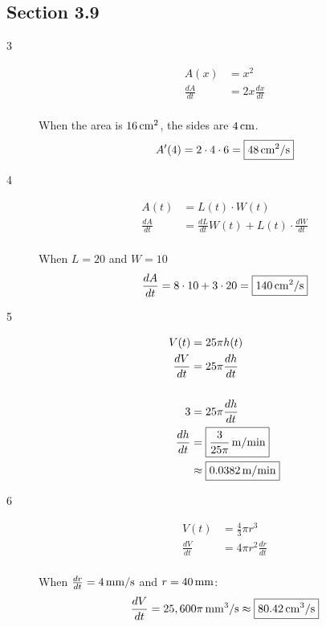 \documentclass[letterpaper, landscape]{exam}
\begin{document}
  \subsection{Section 3.9}
  \begin{description}

    \item[3]
      \begin{align*}
        A(x)          & = x^2 \\
        \frac{dA}{dt} & = 2x \frac{dx}{dt} \\
      \end{align*}

      When the area is $\unit[16]{cm^2}$, the sides are $\unit[4]{cm}$.
      \[
        A'(4) = 2 \cdot 4 \cdot 6 = \boxed{ \unit[48]{cm^2/s} }
      \]

    \item[4]
      \begin{align*}
        A(t)          & = L(t) \cdot W(t) \\
        \frac{dA}{dt} & = \frac{dL}{dt} W(t) + L(t) \cdot \frac{dW}{dt} \\
      \end{align*}

      When $L = 20$ and $W = 10$
      \[
        \frac{dA}{dt} = 8 \cdot 10 + 3 \cdot 20 = \boxed{ \unit[140]{cm^2/s} }
      \]

    \item[5]
      \begin{align*}
        V(t)          & = 25 \pi h(t) \\
        \frac{dV}{dt} & = 25 \pi \frac{dh}{dt} \\
        \\
        3             & = 25 \pi \frac{dh}{dt} \\
        \frac{dh}{dt} & = \boxed{ \unit[\frac{3}{25 \pi}]{m/min} } \\
                      & \approx \boxed{ \unit[0.0382]{m/min} } \\
      \end{align*}

    \item[6]
      \begin{align*}
        V(t)          & = \frac{4}{3} \pi r^3 \\
        \frac{dV}{dt} & = 4 \pi r^2 \frac{dr}{dt} \\
      \end{align*}

      When $\frac{dr}{dt} = \unit[4]{mm/s}$ and $r = \unit[40]{mm}$:
      \[
        \frac{dV}{dt} = \unit[25,600 \pi]{mm^3/s} \approx \boxed{ \unit[80.42]{cm^3/s} }
      \]


\end{description}
\end{document}
